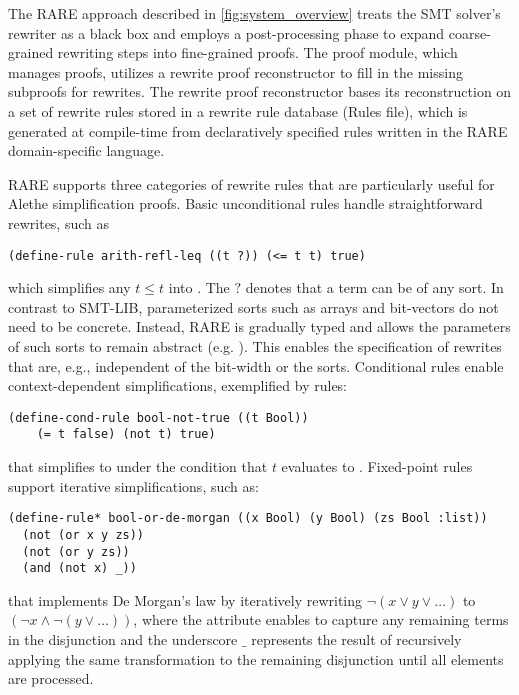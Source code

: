 The RARE approach described in \cref{fig:system_overview} treats the SMT solver's rewriter as a black box and employs a post-processing phase to expand coarse-grained rewriting steps into fine-grained proofs.
The proof module, which manages proofs, utilizes a rewrite proof reconstructor to fill in the missing subproofs for rewrites.
The rewrite proof reconstructor bases its reconstruction on a set of rewrite rules stored in a rewrite rule database (Rules file), which is generated at compile-time from declaratively specified rules written in the RARE domain-specific language.

RARE supports three categories of rewrite rules that are particularly useful for Alethe simplification proofs.
Basic unconditional rules handle straightforward rewrites, such as

\begin{lstlisting}[language=RARE,numbers=none,frame=none,basicstyle=\ttfamily\small]
(define-rule arith-refl-leq ((t ?)) (<= t t) true)
\end{lstlisting}

which simplifies any $t \leq t$ into \true. The $?$ denotes that a term can be of any sort. In contrast to SMT-LIB, parameterized sorts such as arrays and bit-vectors do not need to be concrete.
Instead, RARE is gradually typed and allows the parameters of such sorts to remain abstract (e.g. ). This enables the specification of rewrites that are, e.g., independent of the bit-width or the sorts.
%
Conditional rules enable context-dependent simplifications, exemplified by rules:

\begin{lstlisting}[language=RARE,numbers=none,frame=none,basicstyle=\ttfamily\small]
(define-cond-rule bool-not-true ((t Bool))
    (= t false) (not t) true)
\end{lstlisting}
%
that simplifies  to  under the condition that $t$ evaluates to .
%
Fixed-point rules support iterative simplifications, such as:
%
\begin{lstlisting}[language=RARE,numbers=none,frame=none,basicstyle=\ttfamily\small]
(define-rule* bool-or-de-morgan ((x Bool) (y Bool) (zs Bool :list)) 
  (not (or x y zs))
  (not (or y zs))
  (and (not x) _))
\end{lstlisting}
%
that implements De Morgan's law by iteratively rewriting $\neg (x \lor y \lor \dots)$ to $(\neg x \land \neg (y \lor \dots))$,
where the  attribute enables  to capture any remaining terms in the disjunction and the underscore $\_$ represents the result of recursively applying the same transformation to the remaining disjunction until all elements are processed.

